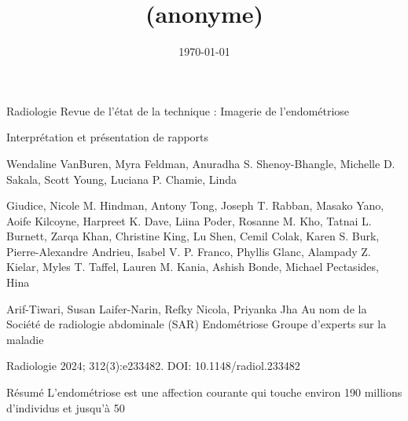 \documentclass[11pt,a4paper]{article}
\title{(anonyme)}
\date{\today}
\begin{document}
\maketitle

Radiologie Revue de l'état de la technique : Imagerie de l'endométriose

Interprétation et présentation de rapports

Wendaline VanBuren, Myra Feldman, Anuradha S. Shenoy-Bhangle, Michelle D. Sakala, Scott Young, Luciana P. Chamie, Linda

Giudice, Nicole M. Hindman, Antony Tong, Joseph T. Rabban, Masako Yano, Aoife Kilcoyne, Harpreet K. Dave, Liina Poder, Rosanne M. Kho, Tatnai L. Burnett, Zarqa Khan, Christine King, Lu Shen, Cemil Colak, Karen S. Burk, Pierre-Alexandre Andrieu, Isabel V. P. Franco, Phyllis Glanc, Alampady Z. Kielar, Myles T. Taffel, Lauren M. Kania, Ashish Bonde, Michael Pectasides, Hina

Arif-Tiwari, Susan Laifer-Narin, Refky Nicola, Priyanka Jha Au nom de la Société de radiologie abdominale (SAR) Endométriose Groupe d'experts sur la maladie

Radiologie 2024; 312(3):e233482. DOI: 10.1148/radiol.233482

Résumé L'endométriose est une affection courante qui touche environ 190 millions d'individus et jusqu'à 50%
\end{document}
